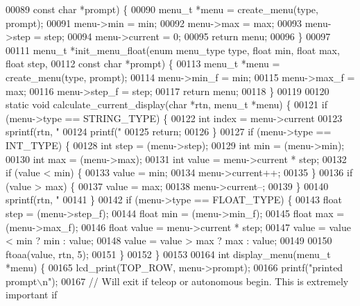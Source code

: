 \begin{DoxyCode}
{00089                       \textcolor{keyword}{const} \textcolor{keywordtype}{char} *prompt) \{
00090   menu_t *menu = create_menu(type, prompt);
00091   menu->min = min;
00092   menu->max = max;
00093   menu->step = step;
00094   menu->current = 0;
00095   \textcolor{keywordflow}{return} menu;
00096 \}
00097 
00111 menu_t *init_menu_float(\textcolor{keyword}{enum} menu_type type, \textcolor{keywordtype}{float} min, \textcolor{keywordtype}{float} max, \textcolor{keywordtype}{float} step,
00112                         \textcolor{keyword}{const} \textcolor{keywordtype}{char} *prompt) \{
00113   menu_t *menu = create_menu(type, prompt);
00114   menu->min_f = min;
00115   menu->max_f = max;
00116   menu->step_f = step;
00117   \textcolor{keywordflow}{return} menu;
00118 \}
00119 
00120 \textcolor{keyword}{static} \textcolor{keywordtype}{void} calculate_current_display(\textcolor{keywordtype}{char} *rtn, menu_t *menu) \{
00121   \textcolor{keywordflow}{if} (menu->type == STRING_TYPE) \{
00122     \textcolor{keywordtype}{int} index = menu->current %
00123     sprintf(rtn, \textcolor{stringliteral}{"%
00124     printf(\textcolor{stringliteral}{"%
00125     \textcolor{keywordflow}{return};
00126   \}
00127   \textcolor{keywordflow}{if} (menu->type == INT_TYPE) \{
00128     \textcolor{keywordtype}{int} step = (menu->step);
00129     \textcolor{keywordtype}{int} min = (menu->min);
00130     \textcolor{keywordtype}{int} max = (menu->max);
00131     \textcolor{keywordtype}{int} value = menu->current * step;
00132     \textcolor{keywordflow}{if} (value < min) \{
00133       value = min;
00134       menu->current++;
00135     \}
00136     \textcolor{keywordflow}{if} (value > max) \{
00137       value = max;
00138       menu->current--;
00139     \}
00140     sprintf(rtn, \textcolor{stringliteral}{"%
00141   \}
00142   \textcolor{keywordflow}{if} (menu->type == FLOAT_TYPE) \{
00143     \textcolor{keywordtype}{float} step = (menu->step_f);
00144     \textcolor{keywordtype}{float} min = (menu->min_f);
00145     \textcolor{keywordtype}{float} max = (menu->max_f);
00146     \textcolor{keywordtype}{float} value = menu->current * step;
00147     value = value < min ? min : value;
00148     value = value > max ? max : value;
00149 
00150     ftoaa(value, rtn, 5);
00151   \}
00152 \}
00153 
00164 \textcolor{keywordtype}{int} display_menu(menu_t *menu) \{
00165   lcd_print(TOP_ROW, menu->prompt);
00166   printf(\textcolor{stringliteral}{"printed prompt\(\backslash\)n"});
00167   \textcolor{comment}{// Will exit if teleop or autonomous begin. This is extremely important if}
}}}}
\end{DoxyCode}
